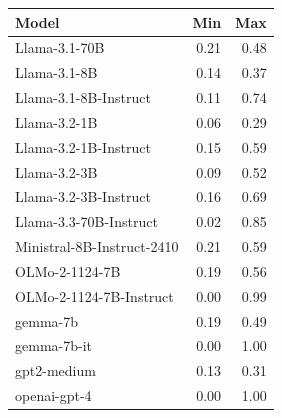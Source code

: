 \begin{tabular}{lrr}
\toprule
Model & Min & Max \\
\midrule
Llama-3.1-70B & 0.21 & 0.48 \\
Llama-3.1-8B & 0.14 & 0.37 \\
Llama-3.1-8B-Instruct & 0.11 & 0.74 \\
Llama-3.2-1B & 0.06 & 0.29 \\
Llama-3.2-1B-Instruct & 0.15 & 0.59 \\
Llama-3.2-3B & 0.09 & 0.52 \\
Llama-3.2-3B-Instruct & 0.16 & 0.69 \\
Llama-3.3-70B-Instruct & 0.02 & 0.85 \\
Ministral-8B-Instruct-2410 & 0.21 & 0.59 \\
OLMo-2-1124-7B & 0.19 & 0.56 \\
OLMo-2-1124-7B-Instruct & 0.00 & 0.99 \\
gemma-7b & 0.19 & 0.49 \\
gemma-7b-it & 0.00 & 1.00 \\
gpt2-medium & 0.13 & 0.31 \\
openai-gpt-4 & 0.00 & 1.00 \\
\bottomrule
\end{tabular}
